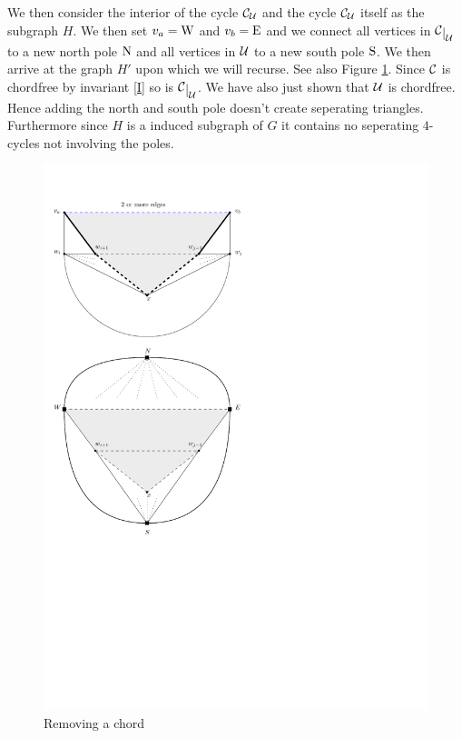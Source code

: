 We then consider the interior of the cycle $\mathcal{C}_{\mathcal{U}}$ and the cycle $\mathcal{C}_{\mathcal{U}}$ itself as the subgraph $H$. We then set $v_a = \mathrm{W}$ and $v_b = \mathrm{E}$ and we connect all vertices in $\restC{\U}$ to a new north pole $\mathrm{N}$ and all vertices in $\mathcal{U}$ to a new south pole $\mathrm{S}$. We then arrive at the graph $H'$ upon which we will recurse. See also Figure \ref{fig:removeChord}. Since $\mathcal{C}$ is chordfree by invariant \ref{I}  so is $\restC{\U}$. We have also just shown that $\mathcal{U}$ is chordfree. Hence adding the north and south pole doesn't create seperating triangles. Furthermore since $H$ is a induced subgraph of $G$ it contains no seperating $4$-cycles not involving the poles.    



\begin{figure}[h!]
\centering
\includegraphics[scale=1]{img/removeChord}

\caption{Removing a chord 
    \label{fig:removeChord}}
\end{figure}

